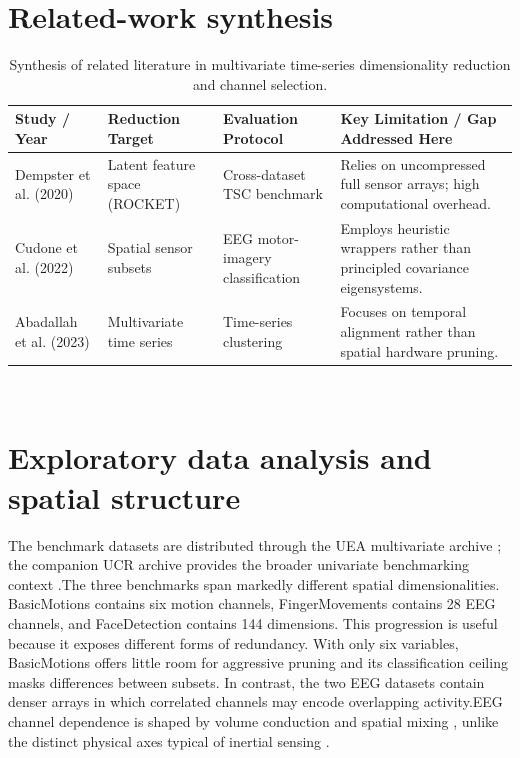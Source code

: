 \section{Related-work synthesis}
\begin{table}[htbp]
\centering
\caption{Synthesis of related literature in multivariate time-series dimensionality reduction and channel selection.}
\label{tab:related_work_synthesis}
\small
\begin{tabularx}{\textwidth}{@{}l l l X@{}}
\toprule
Study / Year & Reduction Target & Evaluation Protocol & Key Limitation / Gap Addressed Here \\
\midrule
Dempster et al. (2020) & Latent feature space (ROCKET) & Cross-dataset TSC benchmark & Relies on uncompressed full sensor arrays; high computational overhead. \\
Cudone et al. (2022) & Spatial sensor subsets & EEG motor-imagery classification & Employs heuristic wrappers rather than principled covariance eigensystems. \\
Abadallah et al. (2023) & Multivariate time series & Time-series clustering & Focuses on temporal alignment rather than spatial hardware pruning. \\
\bottomrule
\end{tabularx}
\end{table}

\

\section{Exploratory data analysis and spatial structure}
\label{sec:eda}
The benchmark datasets are distributed through the UEA multivariate archive
\citep{bagnall2018uea}; the companion UCR archive provides the broader
univariate benchmarking context \citep{dau2019ucr}.The three benchmarks span markedly different spatial dimensionalities. BasicMotions contains six motion channels, FingerMovements contains 28 EEG channels, and FaceDetection contains 144 dimensions. This progression is useful because it exposes different forms of redundancy. With only six variables, BasicMotions offers little room for aggressive pruning and its classification ceiling masks differences between subsets. In contrast, the two EEG datasets contain denser arrays in which correlated channels may encode overlapping activity.EEG channel dependence is shaped by volume conduction and spatial mixing
\citep{nunez2006eeg,blankertz2008bci}, unlike the distinct physical axes
typical of inertial sensing \citep{bulling2014activity}.

